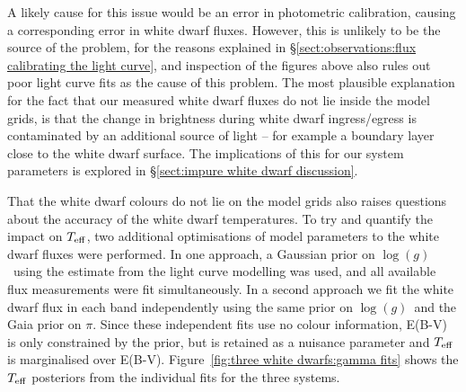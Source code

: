 A likely cause for this issue would be an error in photometric calibration, causing a corresponding error in white dwarf fluxes. However, this is unlikely to be the source of the problem, for the reasons explained in \S\ref{sect:observations:flux calibrating the light curve}, and inspection of the figures above also rules out poor light curve fits as the cause of this problem.
The most plausible explanation for the fact that our measured white dwarf fluxes do not lie inside the model grids, is that the change in brightness during white dwarf ingress/egress is contaminated by an additional source of light -- for example a boundary layer close to the white dwarf surface. The implications of this for our system parameters is explored in \S\ref{sect:impure white dwarf discussion}.

That the white dwarf colours do not lie on the model grids also raises questions about the accuracy of the white dwarf temperatures. To try and quantify the impact on $T_{\rm eff}$, two additional optimisations of model parameters to the white dwarf fluxes were performed.
In one approach, a Gaussian prior on $\log (g)$\ using the estimate from the light curve modelling was used, and all available flux measurements were fit simultaneously.
In a second approach we fit the white dwarf flux in each band independently using the same prior on $\log (g)$\ and the Gaia prior on $\pi$. Since these independent fits use no colour information, E(B-V) is only constrained by the prior, but is retained as a nuisance parameter and $T_{\rm eff}$ is marginalised over E(B-V). Figure~\ref{fig:three white dwarfs:gamma fits} shows the $T_{\rm eff}$ posteriors from the individual fits for the three systems.

